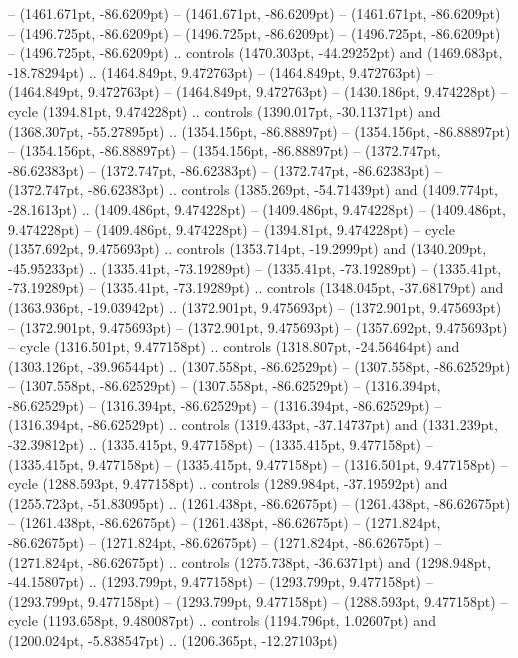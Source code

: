  -- (1461.671pt, -86.6209pt)
 -- (1461.671pt, -86.6209pt)
 -- (1461.671pt, -86.6209pt)
 -- (1496.725pt, -86.6209pt)
 -- (1496.725pt, -86.6209pt)
 -- (1496.725pt, -86.6209pt)
 -- (1496.725pt, -86.6209pt) .. controls (1470.303pt, -44.29252pt) and (1469.683pt, -18.78294pt) .. (1464.849pt, 9.472763pt)
 -- (1464.849pt, 9.472763pt)
 -- (1464.849pt, 9.472763pt)
 -- (1464.849pt, 9.472763pt)
 -- (1430.186pt, 9.474228pt) -- cycle
(1394.81pt, 9.474228pt) .. controls (1390.017pt, -30.11371pt) and (1368.307pt, -55.27895pt) .. (1354.156pt, -86.88897pt)
 -- (1354.156pt, -86.88897pt)
 -- (1354.156pt, -86.88897pt)
 -- (1354.156pt, -86.88897pt)
 -- (1372.747pt, -86.62383pt)
 -- (1372.747pt, -86.62383pt)
 -- (1372.747pt, -86.62383pt)
 -- (1372.747pt, -86.62383pt) .. controls (1385.269pt, -54.71439pt) and (1409.774pt, -28.1613pt) .. (1409.486pt, 9.474228pt)
 -- (1409.486pt, 9.474228pt)
 -- (1409.486pt, 9.474228pt)
 -- (1409.486pt, 9.474228pt)
 -- (1394.81pt, 9.474228pt) -- cycle
(1357.692pt, 9.475693pt) .. controls (1353.714pt, -19.2999pt) and (1340.209pt, -45.95233pt) .. (1335.41pt, -73.19289pt)
 -- (1335.41pt, -73.19289pt)
 -- (1335.41pt, -73.19289pt)
 -- (1335.41pt, -73.19289pt) .. controls (1348.045pt, -37.68179pt) and (1363.936pt, -19.03942pt) .. (1372.901pt, 9.475693pt)
 -- (1372.901pt, 9.475693pt)
 -- (1372.901pt, 9.475693pt)
 -- (1372.901pt, 9.475693pt)
 -- (1357.692pt, 9.475693pt) -- cycle
(1316.501pt, 9.477158pt) .. controls (1318.807pt, -24.56464pt) and (1303.126pt, -39.96544pt) .. (1307.558pt, -86.62529pt)
 -- (1307.558pt, -86.62529pt)
 -- (1307.558pt, -86.62529pt)
 -- (1307.558pt, -86.62529pt)
 -- (1316.394pt, -86.62529pt)
 -- (1316.394pt, -86.62529pt)
 -- (1316.394pt, -86.62529pt)
 -- (1316.394pt, -86.62529pt) .. controls (1319.433pt, -37.14737pt) and (1331.239pt, -32.39812pt) .. (1335.415pt, 9.477158pt)
 -- (1335.415pt, 9.477158pt)
 -- (1335.415pt, 9.477158pt)
 -- (1335.415pt, 9.477158pt)
 -- (1316.501pt, 9.477158pt) -- cycle
(1288.593pt, 9.477158pt) .. controls (1289.984pt, -37.19592pt) and (1255.723pt, -51.83095pt) .. (1261.438pt, -86.62675pt)
 -- (1261.438pt, -86.62675pt)
 -- (1261.438pt, -86.62675pt)
 -- (1261.438pt, -86.62675pt)
 -- (1271.824pt, -86.62675pt)
 -- (1271.824pt, -86.62675pt)
 -- (1271.824pt, -86.62675pt)
 -- (1271.824pt, -86.62675pt) .. controls (1275.738pt, -36.6371pt) and (1298.948pt, -44.15807pt) .. (1293.799pt, 9.477158pt)
 -- (1293.799pt, 9.477158pt)
 -- (1293.799pt, 9.477158pt)
 -- (1293.799pt, 9.477158pt)
 -- (1288.593pt, 9.477158pt) -- cycle
(1193.658pt, 9.480087pt) .. controls (1194.796pt, 1.02607pt) and (1200.024pt, -5.838547pt) .. (1206.365pt, -12.27103pt)
